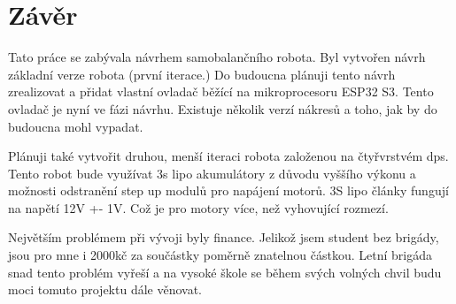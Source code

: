 \chapter*{Závěr}
{}

Tato práce se zabývala návrhem samobalančního robota. Byl vytvořen návrh základní verze robota (první iterace.) Do budoucna plánuji tento návrh zrealizovat a přidat vlastní ovladač běžící na mikroprocesoru ESP32 S3. Tento ovladač je nyní ve fázi návrhu. Existuje několik verzí nákresů a toho, jak by do budoucna mohl vypadat.

Plánuji také vytvořit druhou, menší iteraci robota založenou na čtyřvrstvém \ac{dps}. Tento robot bude využívat 3s \ac{lipo} akumulátory z důvodu vyššího výkonu a možnosti odstranění step up modulů pro napájení motorů. 3S \ac{lipo} články fungují na napětí 12V +- 1V. Což je pro motory více, než vyhovující rozmezí.

Největším problémem při vývoji byly finance. Jelikož jsem student bez brigády, jsou pro mne i 2000kč za součástky poměrně znatelnou částkou. Letní brigáda snad tento problém vyřeší a na vysoké škole se během svých volných chvil budu moci tomuto projektu dále věnovat.